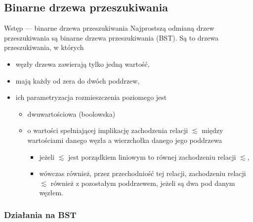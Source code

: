 \documentclass{beamer}
\begin{document}
\subsection{Binarne drzewa przeszukiwania}

\begin{frame}{Wstęp --- binarne drzewa przeszukiwania}
Najprostszą odmianą drzew przeszukiwania są binarne drzewa przeszukiwania (BST).
Są to drzewa przeszukiwania, w których
\begin{itemize}
\item węzły drzewa zawierają tylko jedną wartość,
\item mają każdy od zera do dwóch poddrzew, 
\item ich parametryzacja rozmieszczenia poziomego jest 
\begin{itemize}
\normalsize
\item dwuwartościowa (boolowska)
\item o wartości spełniającej implikację zachodzenia relacji $\lesssim$ między wartościami
danego węzła a wierzchołka danego jego poddrzewa
\begin{itemize}
\normalsize
\item jeżeli $\lesssim$ jest porządkiem liniowym to równej zachodzeniu relacji $\lesssim$,\\
\item wówczas również, przez przechodniość tej relacji, zachodzeniu relacji $\lesssim$
również z pozostałym poddrzewem,
jeżeli są dwa pod danym węzłem.
\end{itemize}
\end{itemize}
\end{itemize}

\end{frame}

\subsubsection{Działania na BST}
\end{document}
